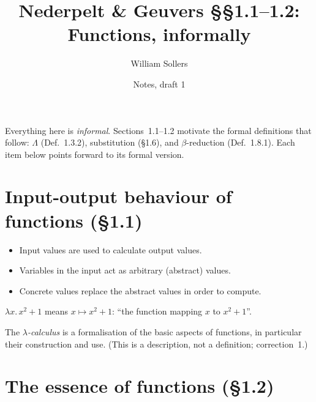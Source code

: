 \documentclass[11pt]{article}
\title{Nederpelt \& Geuvers \S\S1.1--1.2: Functions, informally}
\author{William Sollers}
\date{Notes, draft 1}
\begin{document}
\maketitle

\begin{remark}
Everything here is \emph{informal}. Sections~1.1--1.2 motivate the
formal definitions that follow: $\Lambda$ (Def.~1.3.2), substitution
(\S1.6), and $\beta$-reduction (Def.~1.8.1). Each item below points
forward to its formal version.
\end{remark}

\section{Input-output behaviour of functions (\S1.1)}

\begin{remark}
\begin{itemize}
  \item Input values are used to calculate output values.
  \item Variables in the input act as arbitrary (abstract) values.
  \item Concrete values replace the abstract values in order to compute.
\end{itemize}
\end{remark}

\begin{convention}\label{conv:lambda-notation}
$\lambda x.\, x^2+1$ means $x \mapsto x^2+1$: ``the function mapping $x$
to $x^2+1$''.
\end{convention}

\begin{remark}
The \emph{$\lambda$-calculus} is a formalisation of the basic aspects of
functions, in particular their construction and use. (This is a
description, not a definition; correction~1.)
\end{remark}

\section{The essence of functions (\S1.2)}
\end{document}

